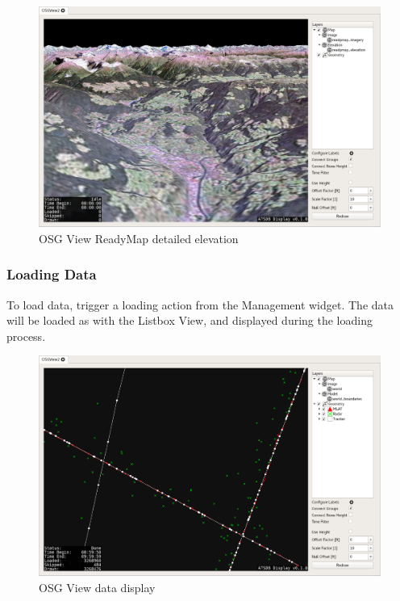 {\begin{figure}[H]
    \hspace*{-2cm}
    \includegraphics[width=18cm]{../screenshots/osgview_readymap_elav.png}
  \caption{OSG View ReadyMap detailed elevation}
\end{figure}


\subsubsection{Loading Data}
To load data, trigger a loading action from the Management widget. The data will be loaded as with the Listbox View, and displayed during the loading process. 

\begin{figure}[H]
    \hspace*{-2cm}
    \includegraphics[width=18cm,frame]{../screenshots/osgview_data.png}
  \caption{OSG View data display}
  \label{fig:osgview_data}
\end{figure}

}
